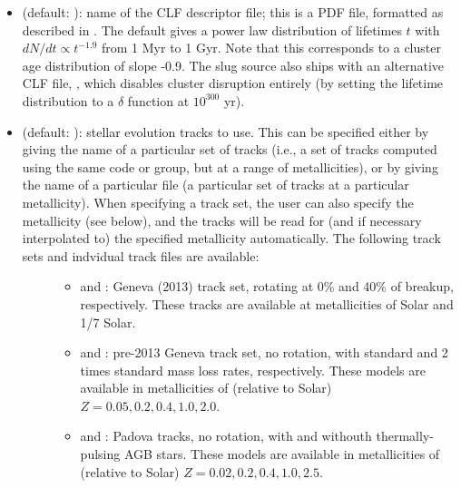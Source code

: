 \documentclass[letterpaper,10pt,english]{sphinxmanual}
\begin{document}
\begin{itemize}
\item {} 
 (default: ): name of the CLF descriptor file; this is a PDF file, formatted as described in {\hyperref[\detokenize{pdfs:sec-pdfs}]{}}. The default gives a power law distribution of lifetimes \(t\) with \(dN/dt\propto t^{-1.9}\) from 1 Myr to 1 Gyr. Note that this corresponds to a cluster age distribution of slope -0.9. The slug source also ships with an alternative CLF file, , which disables cluster disruption entirely (by setting the lifetime distribution to a \(\delta\) function at \(10^{300}\) yr).

\item {} \begin{description}
\item[{ (default: ): stellar evolution tracks to use. This can be specified either by giving the name of a particular set of tracks (i.e., a set of tracks computed using the same code or group, but at a range of metallicities), or by giving the name of a particular file (a particular set of tracks at a particular metallicity). When specifying a track set, the user can also specify the metallicity (see below), and the tracks will be read for (and if necessary interpolated to) the specified metallicity automatically. The following track sets and indvidual track files are available:}] \leavevmode\begin{itemize}
\item {} 
 and : Geneva (2013) track set, rotating at 0\% and 40\% of breakup, respectively. These tracks are available at metallicities of Solar and 1/7 Solar.

\item {} 
 and : pre-2013 Geneva track set, no rotation, with standard and 2 times standard mass loss rates, respectively. These models are available in metallicities of (relative to Solar) \(Z = 0.05, 0.2, 0.4, 1.0, 2.0\).

\item {} 
 and : Padova tracks, no rotation, with and withouth thermally-pulsing AGB stars. These models are available in metallicities of (relative to Solar) \(Z = 0.02, 0.2, 0.4, 1.0, 2.5\).


\end{itemize}
\end{description}
\end{itemize}
\end{document}
